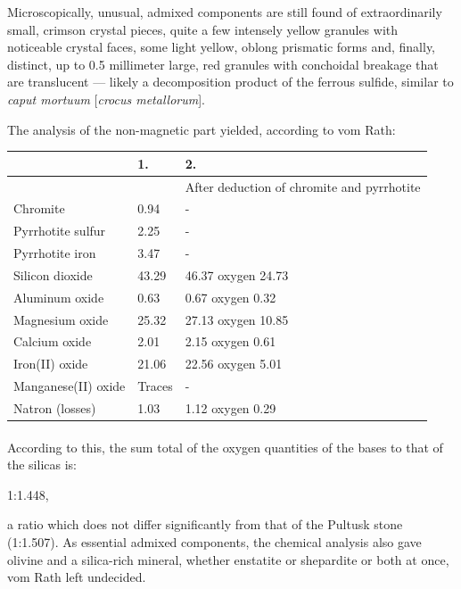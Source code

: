 \documentclass[a4paper, 12pt, oneside]{article}
\begin{document}
Microscopically, unusual, admixed components are still found of extraordinarily small, crimson crystal pieces, quite a few intensely yellow granules with noticeable crystal faces, some light yellow, oblong prismatic forms and, finally, distinct, up to 0.5 millimeter large, red granules with conchoidal breakage that are translucent --- likely a decomposition product of the ferrous sulfide, similar to \emph{caput mortuum} [\emph{crocus metallorum}].

The analysis of the non-magnetic part yielded, according to vom Rath:
\begin{center}
    \begin{tabular}{ |l|p{1.4cm}|p{3.5cm}| }
        \hline
        & 1. & 2.\\\hline
        & & After deduction of chromite and pyrrhotite\\\hline
        Chromite & 0.94 & -\\\hline
        Pyrrhotite sulfur & 2.25 & -\\\hline
        Pyrrhotite iron & 3.47 & -\\\hline
        Silicon dioxide & 43.29 & 46.37 oxygen 24.73\\\hline
        Aluminum oxide & 0.63 & 0.67 oxygen 0.32\\\hline
        Magnesium oxide & 25.32 & 27.13 oxygen 10.85\\\hline
        Calcium oxide & 2.01 & 2.15 oxygen 0.61\\\hline
        Iron(II) oxide & 21.06 & 22.56 oxygen 5.01\\\hline
        Manganese(II) oxide & Traces & -\\\hline
        Natron (losses) & 1.03 & 1.12 oxygen 0.29\\
        \hline
    \end{tabular}
\end{center}
\paragraph*{}
According to this, the sum total of the oxygen quantities of the bases to that of the silicas is:

1:1.448,

a ratio which does not differ significantly from that of the Pultusk stone (1:1.507). As essential admixed components, the chemical analysis also gave olivine and a silica-rich mineral, whether enstatite or shepardite or both at once, vom Rath left undecided.
\end{document}
